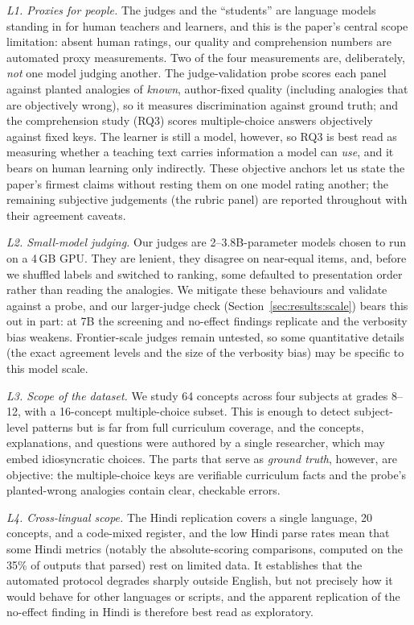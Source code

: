 \documentclass[11pt]{article}
\begin{document}
\emph{L1. Proxies for people.} The judges and the ``students'' are language models standing in for
human teachers and learners, and this is the paper's central scope limitation: absent human ratings,
our quality and comprehension numbers are automated proxy measurements. Two of the four measurements
are, deliberately, \emph{not} one model judging another. The judge-validation probe scores each panel
against planted analogies of \emph{known}, author-fixed quality (including analogies that are
objectively wrong), so it measures discrimination against ground truth; and the comprehension study
(RQ3) scores multiple-choice answers objectively against fixed keys. The learner is still a model,
however, so RQ3 is best read as measuring whether a teaching text carries information a model can
\emph{use}, and it bears on human learning only indirectly. These objective anchors let us state the
paper's firmest claims without resting them on one model rating another; the remaining subjective
judgements (the rubric panel) are reported throughout with their agreement caveats.

\emph{L2. Small-model judging.} Our judges are 2--3.8B-parameter models chosen to run on a 4\,GB GPU.
They are lenient, they disagree on near-equal items, and, before we shuffled labels and switched to
ranking, some defaulted to presentation order rather than reading the analogies. We mitigate these
behaviours and validate against a probe, and our larger-judge check (Section~\ref{sec:results:scale})
bears this out in part: at 7B the screening and no-effect findings replicate and the verbosity bias
weakens. Frontier-scale judges remain untested, so some quantitative details (the exact agreement
levels and the size of the verbosity bias) may be specific to this model scale.

\emph{L3. Scope of the dataset.} We study 64 concepts across four subjects at grades 8--12, with a
16-concept multiple-choice subset. This is enough to detect subject-level patterns but is far from
full curriculum coverage, and the concepts, explanations, and questions were authored by a single
researcher, which may embed idiosyncratic choices. The parts that serve as \emph{ground truth},
however, are objective: the multiple-choice keys are verifiable curriculum facts and the probe's
planted-wrong analogies contain clear, checkable errors.

\emph{L4. Cross-lingual scope.} The Hindi replication covers a single language, 20 concepts, and a
code-mixed register, and the low Hindi parse rates mean that some Hindi metrics (notably the
absolute-scoring comparisons, computed on the 35\% of outputs that parsed) rest on limited data. It
establishes that the automated protocol degrades sharply outside English, but not precisely how it
would behave for other languages or scripts, and the apparent replication of the no-effect finding in
Hindi is therefore best read as exploratory.
\end{document}
